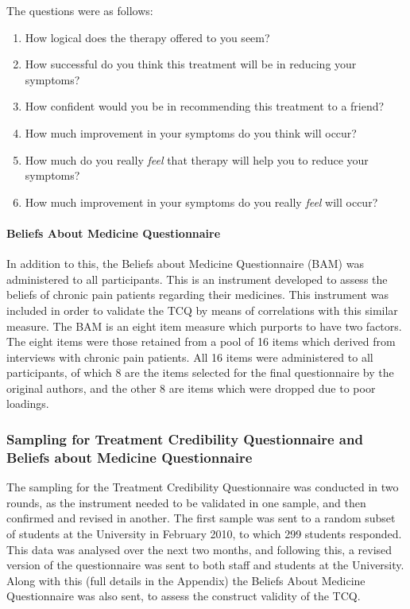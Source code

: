 The questions were as follows:


\begin{enumerate}
	\item How logical does the therapy offered to you seem?
	\item How successful do you think this treatment will be in reducing your symptoms?
 	\item How confident would you be in recommending this treatment to a friend?
	\item How much improvement in your symptoms do you think will occur?
	\item How much do you really \textit{feel} that therapy will help you to reduce your symptoms?
	\item How much improvement in your symptoms do you really \textit{feel} will occur?
\end{enumerate}

\paragraph{Beliefs About Medicine Questionnaire}

In addition to this, the Beliefs about Medicine Questionnaire (BAM) was administered to all participants. This is an instrument developed to assess the beliefs of chronic pain patients regarding their medicines\cite{Horne1999}. This instrument was included in order to validate the TCQ by means of correlations with this similar measure. The BAM is an eight item measure which purports to have two factors. The eight items were those retained from a pool of 16 items which derived from interviews with chronic pain patients. All 16 items were administered to all participants, of which 8 are the items selected for the final questionnaire by the original authors, and the other 8 are items which were dropped due to poor loadings.

\subsubsection{Sampling for Treatment Credibility Questionnaire and Beliefs about Medicine Questionnaire}

The sampling for the Treatment Credibility Questionnaire was conducted in two rounds, as the instrument needed to be validated in one sample, and then confirmed and revised in another. The first sample was sent to a random subset of students at the University in February 2010, to which 299 students responded. This data was analysed over the next two months, and following this, a revised version of the questionnaire was sent to both staff and students at the University. Along with this (full details in the Appendix) the Beliefs About Medicine Questionnaire was also sent, to assess the construct validity of the TCQ. 

